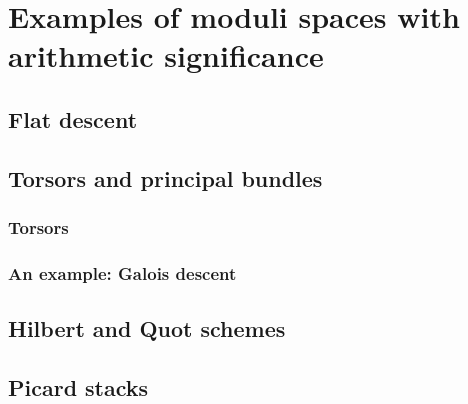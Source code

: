     \section{Examples of moduli spaces with arithmetic significance}
        \subsection{Flat descent}
        
        \subsection{Torsors and principal bundles}
            \subsubsection{Torsors}
            
            \subsubsection{An example: Galois descent}
        
        \subsection{Hilbert and Quot schemes}
    
        \subsection{Picard stacks}
